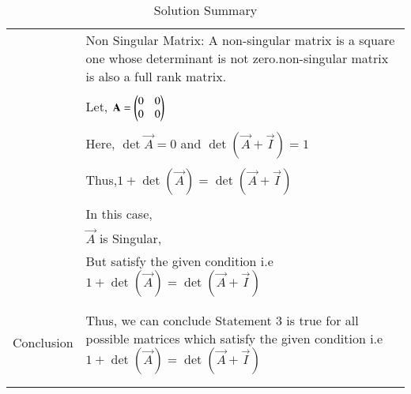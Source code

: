 \documentclass[journal,12pt]{IEEEtran}
\begin{document}
\begin{longtable}{|p{5cm}|p{13cm}|}
   & Non Singular Matrix:
   A non-singular matrix is a square one whose determinant is not zero.non-singular matrix is also  a full rank matrix.\\
   &\\
   & Let, $\mathbf{A}=\begin{pmatrix}0&0\\0&0\end{pmatrix}$\\
	&\\
	& Here, $\det{\vec{A}}=0$ and $\det(\vec{A}+\vec{I})=1$\\
	&\\
	& Thus,$1+\det(\vec{A})=\det(\vec{A}+\vec{I})$\\
	&\\
	& In this case, \\
	& $\vec{A}$ is Singular,\\ & But satisfy the given condition i.e $1+\det(\vec{A})=\det(\vec{A}+\vec{I})$ \\ 
	&\\
	\hline
	\multirow{3}{*}{Conclusion} &\\
	& Thus, we can conclude Statement 3 is true for all possible matrices which satisfy the given condition i.e 
	$1+\det(\vec{A})=\det(\vec{A}+\vec{I})$\\
	&\\
	\hline
	\caption{Solution Summary}
    \label{table:1}
\end{longtable}
\end{document}
